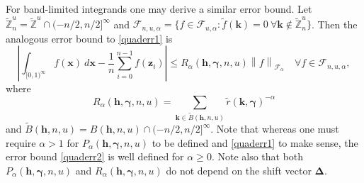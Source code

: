\documentclass{article}
\renewcommand{\vec}[1]{\ensuremath{\mathbf{#1}}}
\newcommand{\vecsym}[1]{\ensuremath{\boldsymbol{#1}}}
\def\abs#1{\ensuremath{\left \lvert #1 \right \rvert}}
\def\norm#1{\ensuremath{\left \lVert #1 \right \rVert}}
\newcommand{\bfgam}{\vecsym \gamma}
\newcommand{\bfDelta}{\vecsym \Delta}
\newcommand{\calF}{\mathcal F}
\newcommand{\Cinf}{[0,1)^{\infty}}
\renewcommand{\k}{\vec k}
\newcommand{\h}{\vec h}
\newcommand{\x}{\vec x}
\newcommand{\z}{\vec z}
\newcommand{\Z}{\mathbb{Z}}
\newcommand{\tZu}{\tilde{\Z}^{u}}
\newcommand{\tZun}{\tilde{\Z}^{u}_{n}}
\begin{document}
For band-limited integrands one may derive a similar error bound.  Let
$\tZun=\tZu \cap (-n/2, n/2]^{\infty}$ and $\calF_{n,u,\alpha} = \{ f
\in \calF_{u,\alpha} : \tilde{f}(\k)=0 \ \forall \k \notin \tZun
\}$.  Then the analogous error bound to \eqref{quaderr1} is
\begin{equation} \label{quaderr2}
    \abs{\int_{\Cinf} f(\x) \ d\x - \frac 1n \sum_{i=0}^{n-1} f(\z_{i})}
    \le R_{\alpha}(\h,\bfgam,n,u) \norm{f}_{\calF_{\alpha}} \quad
    \forall f \in \calF_{n,u,\alpha},
\end{equation}
where
\begin{equation} \label{Rdef}
R_{\alpha}(\h,\bfgam,n,u) = \sum_{\k \in \tilde{B}(\h,n,u)}
\tilde{r}(\k,\bfgam)^{-\alpha}
\end{equation}
and $\tilde{B}(\h,n,u) = B(\h,n,u)\cap (-n/2, n/2]^{\infty}$.  Note that
whereas one must require $\alpha>1$ for $P_{\alpha}(\h,\bfgam,n,u)$ to be
defined and \eqref{quaderr1} to make sense, the error bound
\eqref{quaderr2} is well defined for $\alpha \ge 0$.  Note also that 
both $P_{\alpha}(\h,\bfgam,n,u)$ and $R_{\alpha}(\h,\bfgam,n,u)$ do not depend on 
the shift vector $\bfDelta$.
\end{document}
